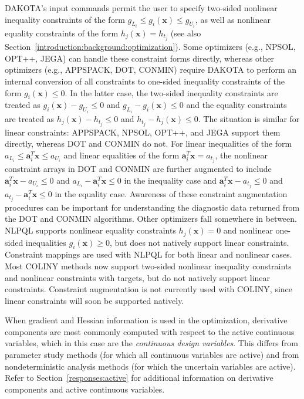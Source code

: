 DAKOTA's input commands permit the user to specify two-sided nonlinear
inequality constraints of the form $g_{L_{i}} \leq g_{i}(\mathbf{x})
\leq g_{U_{i}}$, as well as nonlinear equality constraints of the form
$h_{j}(\mathbf{x}) = h_{t_{j}}$ (see also
Section~\ref{introduction:background:optimization}). Some optimizers
(e.g., NPSOL, OPT++, JEGA) can handle these constraint forms directly,
whereas other optimizers (e.g., APPSPACK, DOT, CONMIN) require DAKOTA
to perform an internal conversion of all constraints to one-sided
inequality constraints of the form $g_{i}(\mathbf{x}) \leq 0$. In the
latter case, the two-sided inequality constraints are treated as
$g_{i}(\mathbf{x}) - g_{U_{i}} \leq 0$ and $g_{L_{i}} -
g_{i}(\mathbf{x}) \leq 0$ and the equality constraints are treated as
$h_{j}(\mathbf{x}) - h_{t_{j}} \leq 0$ and $h_{t_{j}} -
h_{j}(\mathbf{x}) \leq 0$. The situation is similar for linear
constraints: APPSPACK, NPSOL, OPT++, and JEGA support them directly,
whereas DOT and CONMIN do not.  For linear inequalities of the form
$a_{L_{i}} \leq \mathbf{a}_{i}^{T}\mathbf{x} \leq a_{U_{i}}$ and
linear equalities of the form $\mathbf{a}_{i}^{T}\mathbf{x} =
a_{t_{j}}$, the nonlinear constraint arrays in DOT and CONMIN are
further augmented to include $\mathbf{a}_{i}^{T}\mathbf{x} - a_{U_{i}}
\leq 0$ and $a_{L_{i}} - \mathbf{a}_{i}^{T}\mathbf{x} \leq 0$ in the
inequality case and $\mathbf{a}_{i}^{T}\mathbf{x} - a_{t_{j}} \leq 0$
and $a_{t_{j}} - \mathbf{a}_{i}^{T}\mathbf{x} \leq 0$ in the equality
case. Awareness of these constraint augmentation procedures can be
important for understanding the diagnostic data returned from the DOT
and CONMIN algorithms.  Other optimizers fall somewhere in between.
NLPQL supports nonlinear equality constraints $h_{j}(\mathbf{x}) = 0$
and nonlinear one-sided inequalities $g_{i}(\mathbf{x}) \geq 0$, but
does not natively support linear constraints.  Constraint mappings are
used with NLPQL for both linear and nonlinear cases.  Most COLINY
methods now support two-sided nonlinear inequality constraints and
nonlinear constraints with targets, but do not natively support linear
constraints.  Constraint augmentation is not currently used with
COLINY, since linear constraints will soon be supported natively.

When gradient and Hessian information is used in the optimization,
derivative components are most commonly computed with respect to the
active continuous variables, which in this case are the
\emph{continuous design variables}. This differs from parameter study
methods (for which all continuous variables are active) and from
nondeterministic analysis methods (for which the uncertain variables
are active).  Refer to Section~\ref{responses:active} for additional
information on derivative components and active continuous variables.


